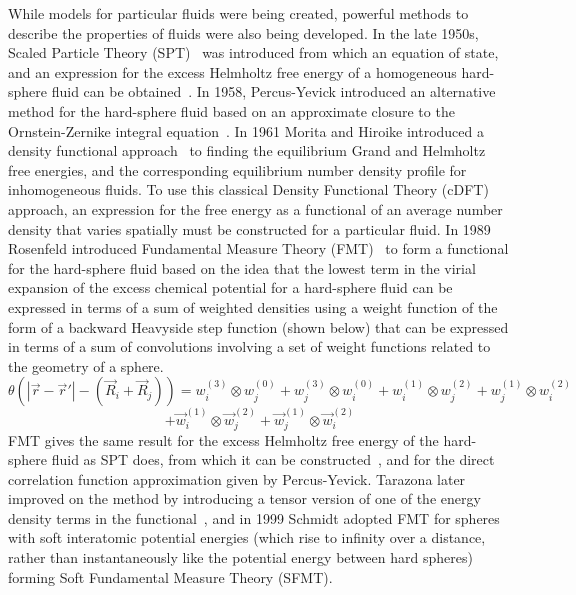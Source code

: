 \documentclass[double,12pt]{beavtex}
\begin{document}
While models for particular fluids were being created, powerful methods 
to describe the properties of fluids were also being developed. 
In the late 1950s, Scaled Particle Theory (SPT)~\cite{ReissSPT} was 
introduced from which an equation of state, and an expression for the 
excess Helmholtz free energy of a homogeneous hard-sphere fluid can be 
obtained~\cite{Hansen}. 
In 1958, Percus-Yevick introduced an alternative method 
for the hard-sphere fluid based on an approximate closure to the 
Ornstein-Zernike integral equation~\cite{PercusYevick}.
In 1961 Morita and Hiroike introduced a density functional 
approach~\cite{MoritaDFT} to finding the equilibrium Grand and Helmholtz free energies, 
and the corresponding equilibrium number density profile for 
inhomogeneous fluids. To use this classical Density Functional Theory (cDFT) 
approach, an expression for the free energy 
as a functional of an average number density that varies spatially 
must be constructed for a particular fluid.
In 1989 Rosenfeld introduced Fundamental Measure Theory (FMT)~\cite{rosenfeld1989,rosenfeld1988} 
to form a functional for the hard-sphere fluid based on the idea that 
the lowest term in the virial expansion 
of the excess chemical potential for a hard-sphere fluid can 
be expressed in terms of a sum of weighted densities using a weight 
function of the form of a backward Heavyside step function (shown below) 
that can be expressed in terms of a sum of convolutions involving 
a set of weight functions related to the geometry of a sphere.
\begin{displaymath}
   \theta(|\vec r - \vec r'|-(\vec R_i + \vec R_j)) = w_i^{(3)} \otimes w_j^{(0)} + w_j^{(3)} \otimes w_i^{(0)} + w_i^{(1)} \otimes w_j^{(2)} + w_j^{(1)} \otimes w_i^{(2)}\end{displaymath}
\begin{equation}   + \vec w_i^{(1)} \otimes \vec w_j^{(2)} + \vec w_j^{(1)} \otimes \vec w_i^{(2)}
\end{equation}
FMT gives the same result for the excess Helmholtz free energy of the hard-sphere fluid as 
SPT does, from which it can be constructed~\cite{rosenfeld1989,Hansen,santos2012phi3},
and for the direct correlation function approximation given by Percus-Yevick.
Tarazona later improved on the 
method by introducing a tensor version of one of the energy density terms 
in the functional~\cite{tarazonaphi3, 
santos2012phi3}, and in 1999 Schmidt adopted FMT for spheres with soft 
interatomic potential energies
(which rise to infinity over a distance, rather than instantaneously 
like the potential energy between hard spheres)
forming Soft Fundamental Measure Theory (SFMT)\cite{schmidt1999density}. 
\end{document}
